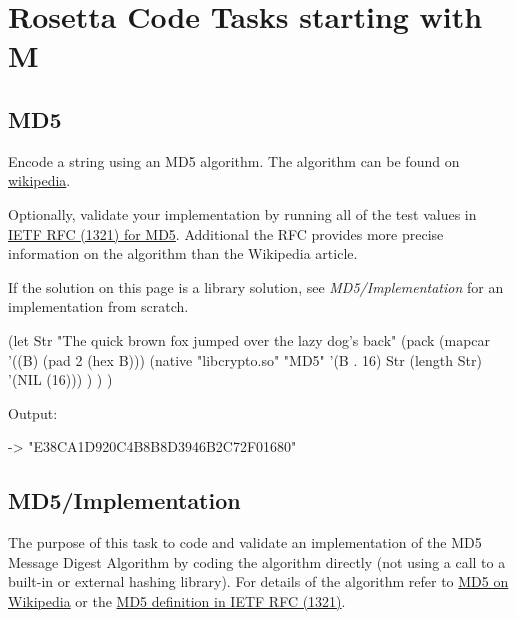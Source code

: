 %
%
%

\chapter{Rosetta Code Tasks starting with M}

\section*{MD5}

Encode a string using an MD5 algorithm. The algorithm can be found on
\href{http://en.wikipedia.org/wiki/Md5\#Algorithm}{wikipedia}.

Optionally, validate your implementation by running all of the test
values in \href{http://tools.ietf.org/html/rfc1321}{IETF RFC (1321) for
MD5}. Additional the RFC provides more precise information on the
algorithm than the Wikipedia article.

If the solution on this page is a library solution, see
\emph{MD5/Implementation} for an implementation from scratch.

\begin{wideverbatim}

(let Str "The quick brown fox jumped over the lazy dog's back"
   (pack
      (mapcar '((B) (pad 2 (hex B)))
         (native "libcrypto.so" "MD5" '(B . 16) Str (length Str) '(NIL (16))) ) ) )

Output:

-> "E38CA1D920C4B8B8D3946B2C72F01680"

\end{wideverbatim}

\pagebreak{}
\section*{MD5/Implementation}

The purpose of this task to code and validate an implementation of the
MD5 Message Digest Algorithm by coding the algorithm directly (not using
a call to a built-in or external hashing library). For details of the
algorithm refer to
\href{http://en.wikipedia.org/wiki/Md5\#Algorithm}{MD5 on Wikipedia} or
the \href{http://www.ietf.org/rfc/rfc1321.txt}{MD5 definition in IETF
RFC (1321)}.

